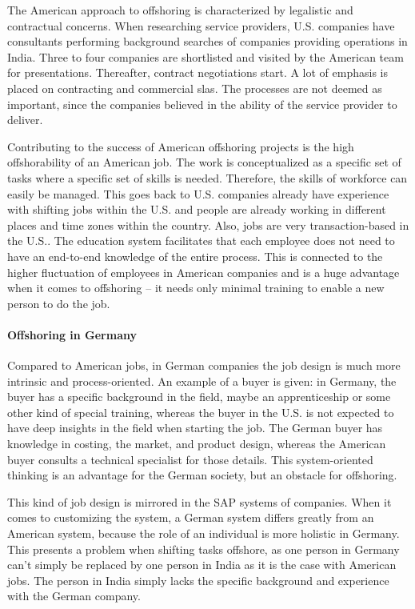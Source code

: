 The American approach to offshoring is characterized by legalistic and contractual concerns. When researching service providers, U.S. companies have consultants performing background searches of companies providing operations in India. Three to four companies are shortlisted and visited by the American team for presentations. Thereafter, contract negotiations start. A lot of emphasis is placed on contracting and commercial \glspl{sla}. The processes are not deemed as important, since the companies believed in the ability of the service provider to deliver.

Contributing to the success of American offshoring projects is the high offshorability of an American job. The work is conceptualized as a specific set of tasks where a specific set of skills is needed. Therefore, the skills of workforce can easily be managed. This goes back to U.S. companies already have experience with shifting jobs within the U.S. and people are already working in different places and time zones within the country. Also, jobs are very transaction-based in the U.S.. The education system facilitates that each employee does not need to have an end-to-end knowledge of the entire process. This is connected to the higher fluctuation of employees in American companies and is a huge advantage when it comes to offshoring -- it needs only minimal training to enable a new person to do the job.

\paragraph{Offshoring in Germany}Compared to American jobs, in German companies the job design is much more intrinsic and process-oriented. An example of a buyer is given: in Germany, the buyer has a specific background in the field, maybe an apprenticeship or some other kind of special training, whereas the buyer in the U.S. is not expected to have deep insights in the field when starting the job. The German buyer has knowledge in costing, the market, and product design, whereas the American buyer consults a technical specialist for those details. This system-oriented thinking is an advantage for the German society, but an obstacle for offshoring.

This kind of job design is mirrored in the SAP systems of companies. When it comes to customizing the system, a German system differs greatly from an American system, because the role of an individual is more holistic in Germany. This presents a problem when shifting tasks offshore, as one person in Germany can't simply be replaced by one person in India as it is the case with American jobs. The person in India simply lacks the specific background and experience with the German company.

